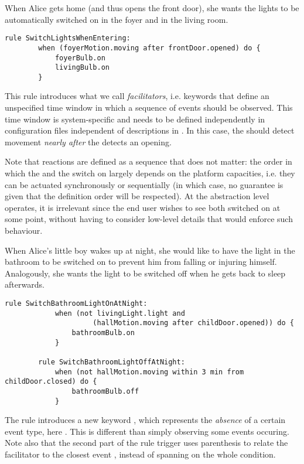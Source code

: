 \begin{description}[leftmargin=0cm]
	\item[Switching entrance lights on when coming in]  When Alice gets home (and thus opens the front door), she wants the lights to be automatically switched on in the foyer and in the living room.
	\begin{lstlisting}[language=iotdsl,
							label=lis:home-rule,
		caption=Rule to switch on the lights at home incoming]
	rule SwitchLightsWhenEntering:
		when (foyerMotion.moving after frontDoor.opened) do {
			foyerBulb.on
			livingBulb.on
		}
	\end{lstlisting}
	This rule introduces what we call \emph{facilitators}, i.e. keywords that define an unspecified time window in which a sequence of events should be observed. This time window is system-specific and needs to be defined independently in configuration files independent of descriptions in \IOTDSL. In this case, the  should detect movement \emph{nearly after} the  detects an opening. 
		
	Note that reactions are defined as a sequence that does not matter: the order in which the  and the  switch on largely depends on the platform capacities, i.e. they can be actuated synchronously or sequentially (in which case, no guarantee is given that the definition order will be respected). At the abstraction level \IOTDSL operates, it is irrelevant since the end user wishes to see both switched on at some point, without having to consider low-level details that would enforce such behaviour.

	\item[Illuminate bathroom when children wake up at night] When Alice's little boy wakes up at night, she would like to have the light in the bathroom to be switched on to prevent him from falling or injuring himself. Analogously, she wants the light to be switched off when he gets back to sleep afterwards.
	\begin{lstlisting}[language=iotdsl,
							label=lis:night-rule,
		caption=Rules to switch on\//off lights in the corridor at night]
		rule SwitchBathroomLightOnAtNight:	
			when (not livingLight.light and 
					 (hallMotion.moving after childDoor.opened)) do {
				bathroomBulb.on
			}
  
		rule SwitchBathroomLightOffAtNight:	
			when (not hallMotion.moving within 3 min from childDoor.closed) do {
				bathroomBulb.off
			}
	\end{lstlisting}
	The rule  introduces a new keyword , which represents the \emph{absence} of a certain event type, here . This is different than simply observing some events occuring. Note also that the second part of the rule trigger uses parenthesis to relate the facilitator  to the closest event , instead of spanning on the whole condition.


\end{description}
